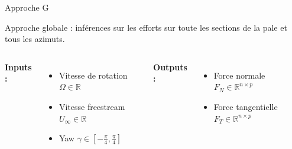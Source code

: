 \documentclass[
11pt,notheorems,hyperref={pdfauthor=whatever}
]{beamer}
\begin{document}
\begin{frame}{Approche G}

Approche globale : inférences sur les efforts sur toute les sections de la pale et tous les azimuts.

    \vspace{0.3cm}

    \begin{columns}[c]
        \textbf{Inputs :}
        \begin{itemize}\small
            \item Vitesse de rotation $\Omega \in \mathbb{R}$
            \item Vitesse freestream $U_{\infty} \in \mathbb{R}$
            \item Yaw $\gamma \in \left[-\frac{\pi}{4}, \frac{\pi}{4}\right]$
        \end{itemize}

        \centering

        \textbf{Outputs :}
        \begin{itemize}\small
            \item Force normale $F_N \in \mathbb{R}^{n \times p}$
            \item Force tangentielle $F_T \in \mathbb{R}^{n \times p}$
        \end{itemize}
    \end{columns}    
\end{frame}



\end{document}
